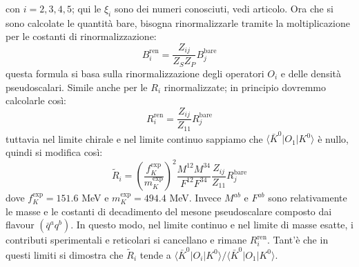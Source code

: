 \documentclass[12pt,a4paper,openright]{article}
\newcommand{\la}{\langle}
\newcommand{\ra}{\rangle}
\newcommand{\bare}{^{\text{bare}}}
\newcommand{\ren}{{\text{ren}}}
\begin{document}
con $i = 2,3,4,5$; qui le $\xi_i$ sono dei numeri conosciuti, vedi articolo.
\newline
Ora che si sono calcolate le quantità bare, bisogna rinormalizzarle tramite la moltiplicazione per le costanti di rinormalizzazione:
\begin{equation*}
  B_i^\ren = \frac{Z_{ij}}{Z_S Z_P} B_j\bare
\end{equation*}
questa formula si basa sulla rinormalizzazione degli operatori $O_i$ e delle densità pseudoscalari.
Simile anche per le $R_i$ rinormalizzate; in principio dovremmo calcolarle così:
\begin{equation*}
  R_i^\ren = \frac{Z_{ij}}{Z_{11}}R_j\bare
\end{equation*}
tuttavia nel limite chirale e nel limite continuo sappiamo che $\la \bar K^0 | O_1 | K^0 \ra$ è nullo, quindi si modifica così:
\begin{equation*}
  \tilde{R}_i = \left(\frac{f_K^{\text{exp}}}{m_K^{\text{exp}}}\right)^2 \frac{M^{12}M^{34}}{F^{12}F^{34}} \frac{Z_{ij}}{Z_{11}}R_j\bare
\end{equation*}
dove $f_K^{\text{exp}} = 151.6$ MeV e $m_K^{\text{exp}} = 494.4$ MeV.
Invece $M^{ab}$ e $F^{ab}$ sono relativamente le masse e le costanti di decadimento del mesone pseudoscalare composto dai flavour $(\bar q^a q^b)$.
In questo modo, nel limite continuo e nel limite di masse esatte, i contributi sperimentali e reticolari si cancellano e rimane $R_i^\ren$.
Tant'è che in questi limiti si dimostra che $\tilde{R}_i$ tende a $\la \bar K^0 | O_i | K^0 \ra / \la \bar K^0 | O_1 | K^0 \ra$.
\end{document}
